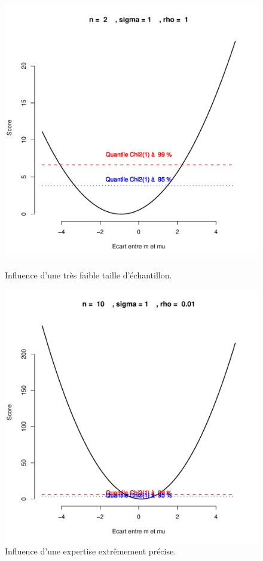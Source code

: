 \begin{figure}[hbtp]
\begin{minipage}[b]{0.5\linewidth}
\includegraphics[scale=0.4]{figures/prior/figure3.pdf}
\caption{Influence d'une très faible taille d'échantillon.}
\label{toto3}
\end{minipage}\hfill 
\begin{minipage}[b]{0.5\linewidth}
\includegraphics[scale=0.4]{figures/prior/figure4.pdf}
\caption{Influence d'une expertise extr\^emement précise.}
\label{toto4}
\end{minipage}


\end{figure}
